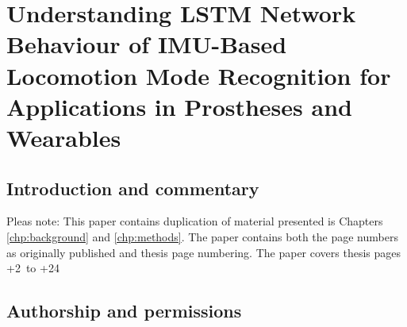 \chapter[Paper: LSTM Network Behaviour for IMU Based Locomotion Mode Recognition Systems]{Understanding LSTM Network Behaviour of IMU-Based Locomotion Mode Recognition for Applications in Prostheses and Wearables}
\label{chp:lstm-general}

\section{Introduction and commentary}
\newcommand\x{\value{page}}
Pleas note: This paper contains duplication of material presented is Chapters \ref{chp:background} and \ref{chp:methods}. The paper contains both the page numbers as originally published and thesis page numbering. The paper covers thesis pages \the\numexpr\x+2\relax \ to \the\numexpr\x+24\relax

\clearpage
\section{Authorship and permissions}
\newcommand{\backgoundColor}{1,1,1}
\newcommand{\boxColor}{0.95,0.95,0.95}

